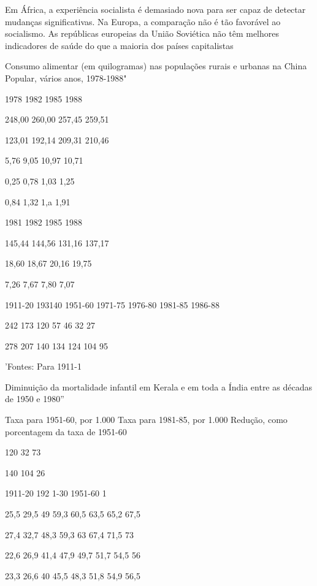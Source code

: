 \documentclass[twocolumn,amsmath,amssymb,aps,pre,floatfix]{revtex4-2}
\begin{document}
\par
Em África, a experiência socialista é demasiado nova para ser capaz de detectar mudanças significativas. Na Europa, a comparação não é tão favorável ao socialismo. As repúblicas europeias da União Soviética não têm melhores indicadores de saúde do que a maioria dos países capitalistas
\par
Consumo alimentar (em quilogramas) nas populações rurais e urbanas na China Popular, vários anos, 1978-1988"
\par
1978 1982 1985 1988
\par
248,00 260,00 257,45 259,51
\par
123,01 192,14 209,31 210,46
\par
5,76 9,05 10,97 10,71
\par
0,25 0,78 1,03 1,25
\par
0,84 1,32 1,a 1,91
\par
1981 1982 1985 1988
\par
145,44 144,56 131,16 137,17
\par
18,60 18,67 20,16 19,75
\par
7,26 7,67 7,80 7,07
\par
1911-20 193140 1951-60 1971-75 1976-80 1981-85 1986-88
\par
242 173 120 57 46 32 27
\par
278 207 140 134 124 104 95
\par
'Fontes: Para 1911-1%
\par
Diminuição da mortalidade infantil em Kerala e em toda a Índia entre as décadas de 1950 e 1980''
\par
Taxa para 1951-60, por 1.000 Taxa para 1981-85, por 1.000 Redução, como porcentagem da taxa de 1951-60
\par
120 32 73%
\par
140 104 26%
\par
1911-20 192 1-30 1951-60 1%
\par
25,5 29,5 49 59,3 60,5 63,5 65,2 67,5
\par
27,4 32,7 48,3 59,3 63 67,4 71,5 73
\par
22,6 26,9 41,4 47,9 49,7 51,7 54,5 56
\par
23,3 26,6 40 45,5 48,3 51,8 54,9 56,5
\end{document}
